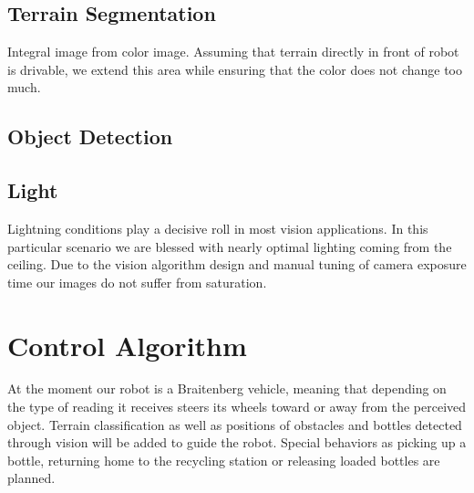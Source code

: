 \subsection{Terrain Segmentation}
Integral image from color image. Assuming that terrain directly in front of robot is 
drivable, we extend this area while ensuring that the color does not change too much.

\subsection{Object Detection}

\subsection{Light}
Lightning conditions play a decisive roll in most vision applications. In this
particular scenario we are blessed with nearly optimal lighting coming from the
ceiling. Due to the vision algorithm design and manual tuning of camera exposure time
our images do not suffer from saturation.

\section{Control Algorithm}
At the moment our robot is a Braitenberg vehicle, meaning that depending on the type
of reading it receives steers its wheels toward or away from the perceived object. 
Terrain classification as well as positions of obstacles and bottles detected through 
vision will be added to guide the robot. Special behaviors as picking up a bottle, 
returning home to the recycling station or releasing loaded bottles are planned.
